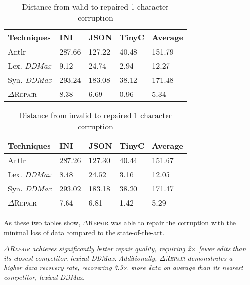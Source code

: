 \documentclass[acmsmall,screen,review,anonymous]{acmart}
\newenvironment{result}{\begin{framed}\centering\it}{\end{framed}}
\newcommand{\approach}{\textsc{$\Delta$Repair}\xspace}
\newcommand{\ddmax}{\textit{DDMax}\xspace}
\newcommand{\drepair}{\approach}
\begin{document}
\begin{table}[!tbp]
\centering
\caption{Distance from valid to repaired 1 character corruption}
\begin{tabular}{|p{4.0cm}|p{1.5cm}|p{1.5cm}|p{1.5cm}|p{1.5cm}|}
\hline
\textbf{Techniques} & \textbf{INI} & \textbf{JSON} & \textbf{TinyC} & \textbf{Average} \\
\hline
Antlr & 287.66 & 127.22 & 40.48 & 151.79 \\
Lex. \ddmax & 9.12 & 24.74 & 2.94 & 12.27 \\
Syn. \ddmax & 293.24 & 183.08 & 38.12 & 171.48 \\
\drepair & 8.38 & 6.69 & 0.96 & 5.34 \\
\hline
\end{tabular}
\label{tab:validtorepaired}
\end{table}

\begin{table}[!tbp]
\centering
\caption{Distance from invalid to repaired 1 character corruption}
\begin{tabular}{|p{4.0cm}|p{1.5cm}|p{1.5cm}|p{1.5cm}|p{1.5cm}|}
\hline
\textbf{Techniques} & \textbf{INI} & \textbf{JSON} & \textbf{TinyC} & \textbf{Average} \\
\hline
Antlr & 287.26 & 127.30 & 40.44 & 151.67 \\
Lex. \ddmax & 8.48 & 24.52 & 3.16 & 12.05 \\
Syn. \ddmax & 293.02 & 183.18 & 38.20 & 171.47 \\
\drepair & 7.64 & 6.81 & 1.42 & 5.29 \\
\hline
\end{tabular}
\label{tab:invalidtorepaired}
\end{table}

As these two tables show, \drepair was able to repair the corruption with the
minimal loss of data compared to the state-of-the-art.


\begin{result}
\drepair achieves significantly better repair quality, requiring 2$\times$
fewer edits than its closest competitor, lexical \ddmax.
Additionally, \drepair demonstrates a higher data recovery rate, recovering
2.3$\times$ more data on average than its nearest competitor, lexical \ddmax.
\end{result}
\end{document}
